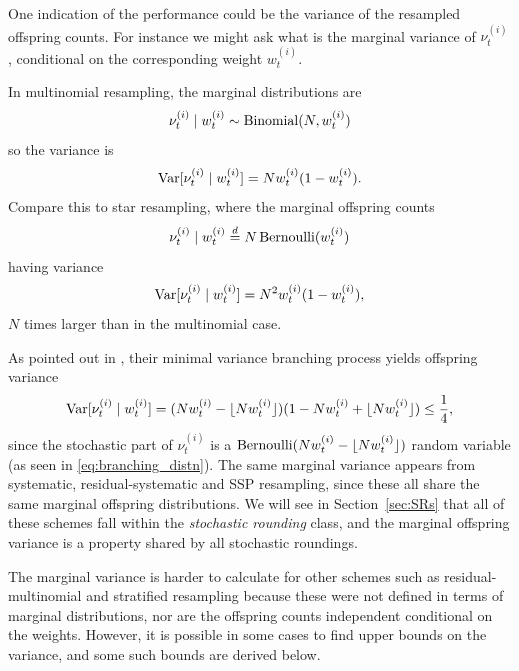 One indication of the performance could be the variance of the resampled offspring counts. For instance we might ask what is the marginal variance of $\nu_t^{(i)}$, conditional on the corresponding weight $w_t^{(i)}$.

In multinomial resampling, the marginal distributions are
\begin{equation}
\nu_t^{(i)} \mid w_t^{(i)} 
\sim \operatorname{Binomial}(N, w_t^{(i)})
\end{equation}
so the variance is
\begin{equation}
\operatorname{Var}[ \nu_t^{(i)} \mid w_t^{(i)} ]
= N w_t^{(i)} ( 1- w_t^{(i)} ) .
\end{equation}
Compare this to star resampling, where the marginal offspring counts
\begin{equation}
\nu_t^{(i)} \mid w_t^{(i)} 
\overset{d}{=} N \operatorname{Bernoulli}( w_t^{(i)} )
\end{equation}
having variance
\begin{equation}
\operatorname{Var}[ \nu_t^{(i)} \mid w_t^{(i)} ]
= N^2 w_t^{(i)} ( 1- w_t^{(i)} ) ,
\end{equation}
$N$ times larger than in the multinomial case.

As pointed out in \textcite[p.557]{crisan1999}, their minimal variance branching process yields offspring variance
\begin{equation}
\operatorname{Var}[ \nu_t^{(i)} \mid w_t^{(i)} ]
= ( Nw_t^{(i)} -\lfloor N w_t^{(i)} \rfloor )(1- Nw_t^{(i)} + \lfloor N w_t^{(i)} \rfloor) 
\leq \frac{1}{4} ,
\end{equation}
since the stochastic part of $\nu_t^{(i)}$ is a $\operatorname{Bernoulli}( Nw_t^{(i)} -\lfloor N w_t^{(i)} \rfloor )$ random variable (as seen in \eqref{eq:branching_distn}).
The same marginal variance appears from systematic, residual-systematic and SSP resampling, since these all share the same marginal offspring distributions. We will see in Section~\ref{sec:SRs} that all of these schemes fall within the \emph{stochastic rounding} class, and the marginal offspring variance is a property shared by all stochastic roundings.

The marginal variance is harder to calculate for other schemes such as residual-multinomial and stratified resampling because these were not defined in terms of marginal distributions, nor are the offspring counts independent conditional on the weights.
However, it is possible in some cases to find upper bounds on the variance, and some such bounds are derived below.

